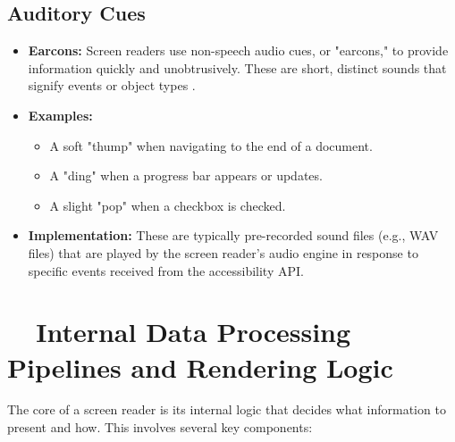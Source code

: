\subsection{Auditory Cues}
\label{sub:auditory-cues}

\begin{itemize}
	\item \textbf{Earcons:} Screen readers use non-speech audio cues, or "earcons," to provide information quickly and unobtrusively. These are short, distinct sounds that signify events or object types \cite{Grunwald1999AuditoryLatency}.
	\item \textbf{Examples:}
	      \begin{itemize}
		      \item A soft "thump" when navigating to the end of a document.
		      \item A "ding" when a progress bar appears or updates.
		      \item A slight "pop" when a checkbox is checked.
	      \end{itemize}
	\item \textbf{Implementation:} These are typically pre-recorded sound files (e.g., WAV files) that are played by the screen reader's audio engine in response to specific events received from the accessibility API.
\end{itemize}

\section{~~Internal Data Processing Pipelines and Rendering Logic}
\label{sec:internal-data-processing-pipelines-and-rendering-logic}

The core of a screen reader is its internal logic that decides what information to present and how. This involves several key components:

